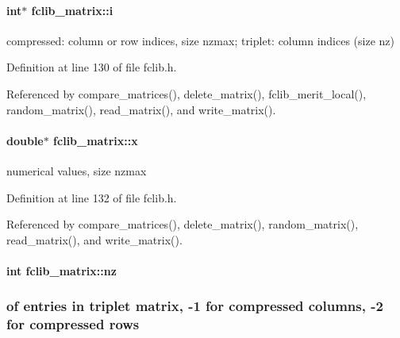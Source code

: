 \hypertarget{structfclib__matrix_aed86c681657206e7502450e437dba667}{}
\paragraph[{i}]{\setlength{\rightskip}{0pt plus 5cm}int$\ast$ fclib\+\_\+matrix\+::i}\label{structfclib__matrix_aed86c681657206e7502450e437dba667}


compressed\+: column or row indices, size nzmax; triplet\+: column indices (size nz) 



Definition at line 130 of file fclib.\+h.



Referenced by compare\+\_\+matrices(), delete\+\_\+matrix(), fclib\+\_\+merit\+\_\+local(), random\+\_\+matrix(), read\+\_\+matrix(), and write\+\_\+matrix().

\hypertarget{structfclib__matrix_aba1891f51a81f973249456c91715e06d}{}
\paragraph[{x}]{\setlength{\rightskip}{0pt plus 5cm}double$\ast$ fclib\+\_\+matrix\+::x}\label{structfclib__matrix_aba1891f51a81f973249456c91715e06d}


numerical values, size nzmax 



Definition at line 132 of file fclib.\+h.



Referenced by compare\+\_\+matrices(), delete\+\_\+matrix(), random\+\_\+matrix(), read\+\_\+matrix(), and write\+\_\+matrix().

\hypertarget{structfclib__matrix_a7d64a7cddc93a8e1f96ab32e9afe0bbb}{}
\paragraph[{nz}]{\setlength{\rightskip}{0pt plus 5cm}int fclib\+\_\+matrix\+::nz}\label{structfclib__matrix_a7d64a7cddc93a8e1f96ab32e9afe0bbb}


\subsubsection*{of entries in triplet matrix, -\/1 for compressed columns, -\/2 for compressed rows}



